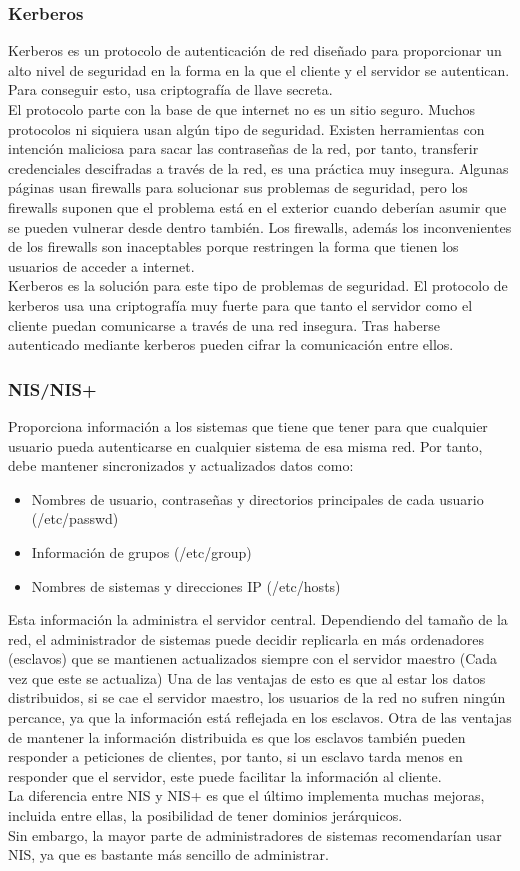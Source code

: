 \documentclass[titlepage, 12pt, a4paper]{article}
\begin{document}
\subsubsection{Kerberos}
Kerberos es un protocolo de autenticación de red diseñado para proporcionar un alto nivel de seguridad en la forma en la que el cliente y el servidor se autentican. Para conseguir esto, usa criptografía de llave secreta.\cite{mit-kerberos}\\El protocolo parte con la base de que internet no es un sitio seguro. Muchos protocolos ni siquiera usan algún tipo de seguridad. Existen herramientas con intención maliciosa para sacar las contraseñas de la red, por tanto, transferir credenciales descifradas a través de la red, es una práctica muy insegura. Algunas páginas usan \Gls{firewalls} para solucionar sus problemas de seguridad, pero los \Gls{firewalls} suponen que el problema está en el exterior cuando deberían asumir que se pueden vulnerar desde dentro también. Los firewalls, además los inconvenientes de los firewalls son inaceptables porque restringen la forma que tienen los usuarios de acceder a internet.\\Kerberos es la solución para este tipo de problemas de seguridad. El protocolo de kerberos usa una criptografía muy fuerte para que tanto el servidor como el cliente puedan comunicarse a través de una red insegura. Tras haberse autenticado mediante \Gls{kerberos} pueden cifrar la comunicación entre ellos.
\subsubsection{\Gls{NIS/NIS+}}
Proporciona información a los sistemas que tiene que tener para que cualquier usuario pueda autenticarse en cualquier sistema de esa misma red. Por tanto, debe mantener sincronizados y actualizados datos como:
\begin{itemize}
	\item Nombres de usuario, contraseñas y directorios principales de cada usuario (/etc/passwd)
	\item Información de grupos (/etc/group)
	\item Nombres de sistemas y direcciones IP (/etc/hosts)
\end{itemize}
Esta información la administra el servidor central. Dependiendo del tamaño de la red, el administrador de sistemas puede decidir replicarla en más ordenadores (esclavos) que se mantienen actualizados siempre con el servidor maestro (Cada vez que este se actualiza) Una de las ventajas de esto es que al estar los datos distribuidos, si se cae el servidor maestro, los usuarios de la red no sufren ningún percance, ya que la información está reflejada en los esclavos. Otra de las ventajas de mantener la información distribuida es que los esclavos también pueden responder a peticiones de clientes, por tanto, si un esclavo tarda menos en responder que el servidor, este puede facilitar la información al cliente.\\La diferencia entre NIS y NIS+ es que el último implementa muchas mejoras, incluida entre ellas, la posibilidad de tener dominios jerárquicos.\\Sin embargo, la mayor parte de administradores de sistemas recomendarían usar NIS, ya que es bastante más sencillo de administrar.
\end{document}
